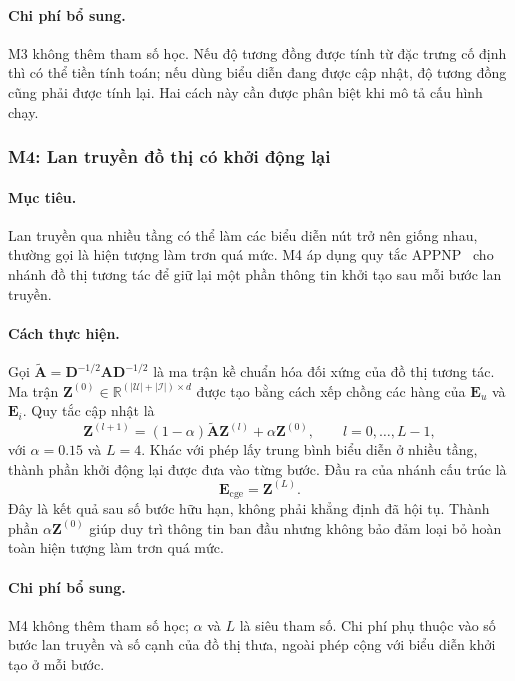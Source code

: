 \paragraph{Chi phí bổ sung.}
M3 không thêm tham số học. Nếu độ tương đồng được tính từ đặc trưng cố định thì có thể tiền tính toán; nếu dùng biểu diễn đang được cập nhật, độ tương đồng cũng phải được tính lại. Hai cách này cần được phân biệt khi mô tả cấu hình chạy.

\subsubsection{M4: Lan truyền đồ thị có khởi động lại}

\paragraph{Mục tiêu.}
Lan truyền qua nhiều tầng có thể làm các biểu diễn nút trở nên giống nhau, thường gọi là hiện tượng làm trơn quá mức. M4 áp dụng quy tắc APPNP~\cite{klicpera2019predict} cho nhánh đồ thị tương tác để giữ lại một phần thông tin khởi tạo sau mỗi bước lan truyền.

\paragraph{Cách thực hiện.}
Gọi $\tilde{\mathbf A}=\mathbf D^{-1/2}\mathbf A\mathbf D^{-1/2}$ là ma trận kề chuẩn hóa đối xứng của đồ thị tương tác. Ma trận $\mathbf Z^{(0)}\in\mathbb R^{(|\mathcal U|+|\mathcal I|)\times d}$ được tạo bằng cách xếp chồng các hàng của $\mathbf E_u$ và $\mathbf E_i$. Quy tắc cập nhật là
\begin{equation}
\mathbf Z^{(l+1)}=(1-\alpha)\tilde{\mathbf A}\mathbf Z^{(l)}+\alpha\mathbf Z^{(0)},
\qquad l=0,\ldots,L-1,
\label{eq:appnp_diffusion}
\end{equation}
với $\alpha=0.15$ và $L=4$. Khác với phép lấy trung bình biểu diễn ở nhiều tầng, thành phần khởi động lại được đưa vào từng bước. Đầu ra của nhánh cấu trúc là
\begin{equation}
\mathbf E_{\text{cge}}=\mathbf Z^{(L)}.
\label{eq:appnp_final}
\end{equation}
Đây là kết quả sau số bước hữu hạn, không phải khẳng định đã hội tụ. Thành phần $\alpha\mathbf Z^{(0)}$ giúp duy trì thông tin ban đầu nhưng không bảo đảm loại bỏ hoàn toàn hiện tượng làm trơn quá mức.

\paragraph{Chi phí bổ sung.}
M4 không thêm tham số học; $\alpha$ và $L$ là siêu tham số. Chi phí phụ thuộc vào số bước lan truyền và số cạnh của đồ thị thưa, ngoài phép cộng với biểu diễn khởi tạo ở mỗi bước.

